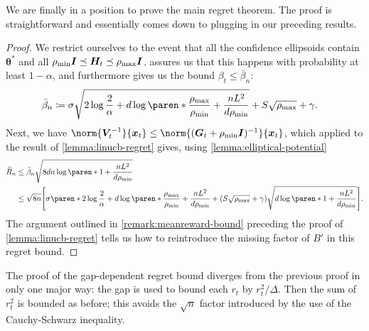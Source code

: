 \documentclass{article}
\renewcommand{\vec}[1]{\bm{#1}}
\newcommand{\defeq}{\coloneq}
\newcommand{\inv}[1]{#1^{-1}}
\DeclarePairedDelimiter{\paren}()
\DeclarePairedDelimiter{\brck}{[}{]}
\newcommand{\Eye}[1][]{\bm{I}\notblank{#1}{_{{#1}\times{#1}}}{}}
\begin{document}
We are finally in a position to prove the main regret theorem.  The
proof is straightforward and essentially comes down to plugging in our
preceding results.

\ThmLinUCBRegret*

\begin{proof}
  We restrict ourselves to the event that all the confidence
  ellipsoids contain $\vec\theta^*$ and all
  $\rho_{\min}\Eye \preceq \vec H_t \preceq \rho_{\max}\Eye$.
   assures us that this happens with probability at least
  $1-\alpha$, and furthermore gives us the bound $\beta_t \le \bar\beta_n$:
  \begin{align*}
    \bar\beta_n &\defeq \sigma\sqrt{2\log\frac{2}{\alpha} + d\log\paren*{\frac{\rho_{\max}}{\rho_{\min}}
                 + \frac{nL^2}{d\rho_{\min}}}}
                 + S\sqrt{\rho_{\max}} + \gamma.
  \end{align*}
  Next, we have
  $\norm{\inv{\vec V_t}}{\vec x_t} \le
  \norm{\inv{(\vec G_t+\rho_{\min}\Eye)}}{\vec x_t}$, which applied to the
  result of \cref{lemma:linucb-regret} gives, using
  \cref{lemma:elliptical-potential}
  \begin{align*}
    \widehat{R}_n
    &\le \bar\beta_n\sqrt{8dn\log\paren*{1+\frac{nL^2}{d\rho_{\min}}}} \\
    &\le \sqrt{8n}\brck*{\sigma\paren*{2\log\frac{2}{\alpha}
      + d\log\paren*{\frac{\rho_{\max}}{\rho_{\min}} + \frac{nL^2}{d\rho_{\min}}}}
      + (S\sqrt{\rho_{\max}}+\gamma)\sqrt{d\log\paren*{1+\frac{nL^2}{d\rho_{\min}}}}}.
  \end{align*}
  The argument outlined in \cref{remark:meanreward-bound} preceding
  the proof of \cref{lemma:linucb-regret} tells us how to reintroduce
  the missing factor of $B'$ in this regret bound.
\end{proof}

The proof of the gap-dependent regret bound diverges from the previous
proof in only one major way: the gap is used to bound each $r_t$ by
$r_t^2/\Delta$.  Then the sum of $r_t^2$ is bounded as before; this
avoids the $\sqrt n$ factor introduced by the use of the
Cauchy-Schwarz inequality.

\ThmLinUCBGapRegret*
\end{document}
